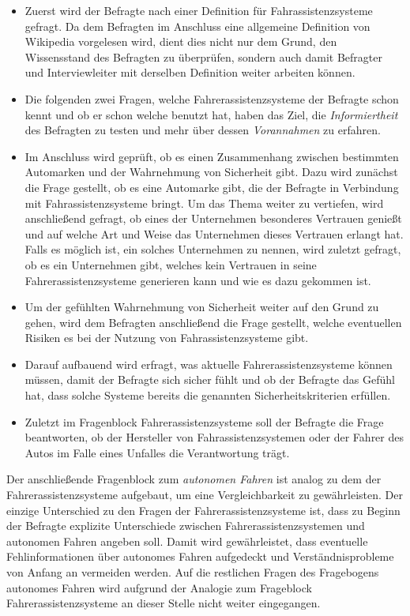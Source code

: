 \documentclass[12pt]{article}
\begin{document}
\begin{itemize}
  \item Zuerst wird der Befragte nach einer Definition für Fahrassistenzsysteme gefragt. Da dem Befragten im Anschluss eine allgemeine Definition von Wikipedia vorgelesen wird, dient dies nicht nur dem Grund, den Wissensstand des Befragten zu überprüfen, sondern auch damit Befragter und Interviewleiter mit derselben Definition weiter arbeiten können.

  \item Die folgenden zwei Fragen, welche Fahrerassistenzsysteme der Befragte schon kennt und ob er schon welche benutzt hat, haben das Ziel, die \emph{Informiertheit} des Befragten zu testen und mehr über dessen \emph{Vorannahmen} zu erfahren.

  \item Im Anschluss wird geprüft, ob es einen Zusammenhang zwischen bestimmten Automarken und der Wahrnehmung von Sicherheit gibt. Dazu wird zunächst die Frage gestellt, ob es eine Automarke gibt, die der Befragte in Verbindung mit Fahrassistenzsysteme bringt. Um das Thema weiter zu vertiefen, wird anschließend gefragt, ob eines der Unternehmen besonderes Vertrauen genießt und auf welche Art und Weise das Unternehmen dieses Vertrauen erlangt hat. Falls es möglich ist, ein solches Unternehmen zu nennen, wird zuletzt gefragt, ob es ein Unternehmen gibt, welches kein Vertrauen in seine Fahrerassistenzsysteme generieren kann und wie es dazu gekommen ist.

  \item Um der gefühlten Wahrnehmung von Sicherheit weiter auf den Grund zu gehen, wird dem Befragten anschließend die Frage gestellt, welche eventuellen Risiken es bei der Nutzung von Fahrassistenzsysteme gibt.

  \item Darauf aufbauend wird erfragt, was aktuelle Fahrerassistenzsysteme können müssen, damit der Befragte sich sicher fühlt und ob der Befragte das Gefühl hat, dass solche Systeme bereits die genannten Sicherheitskriterien erfüllen.

  \item Zuletzt im Fragenblock Fahrerassistenzsysteme soll der Befragte die Frage beantworten, ob der Hersteller von Fahrassistenzsystemen oder der Fahrer des Autos im Falle eines Unfalles die Verantwortung trägt.
\end{itemize}



Der anschließende Fragenblock zum \emph{autonomen Fahren} ist analog zu dem der Fahrerassistenzsysteme aufgebaut, um eine Vergleichbarkeit zu gewährleisten. Der einzige Unterschied zu den Fragen der Fahrerassistenzsysteme ist, dass zu Beginn der Befragte explizite Unterschiede zwischen Fahrerassistenzsystemen und autonomen Fahren angeben soll. Damit wird gewährleistet, dass eventuelle Fehlinformationen über autonomes Fahren aufgedeckt und Verständnisprobleme von Anfang an vermeiden werden. Auf die restlichen Fragen des Fragebogens autonomes Fahren wird aufgrund der Analogie zum Frageblock Fahrerassistenzsysteme an dieser Stelle nicht weiter eingegangen.
\end{document}

